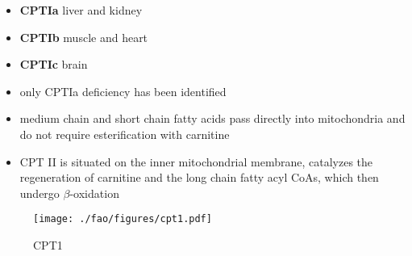\documentclass{scrartcl}
\begin{document}
\begin{enumerate}
\begin{enumerate}
\begin{itemize}
\item \textbf{CPTIa} liver and kidney
\item \textbf{CPTIb}  muscle and heart
\item \textbf{CPTIc}  brain
\item only CPTIa deficiency has been identified
\item medium chain and short chain fatty acids pass directly into
mitochondria and do not require esterification with carnitine
\item CPT II is situated on the inner mitochondrial membrane, catalyzes
the regeneration of carnitine and the long chain fatty acyl CoAs,
which then undergo \(\beta\)-oxidation
\end{itemize}

\begin{figure}[htbp]
\centering
\texttt{[image: ./fao/figures/cpt1.pdf]}
\caption{\label{fig:orgab248a8}
CPT1}
\end{figure}


\end{enumerate}
\end{enumerate}
\end{document}
